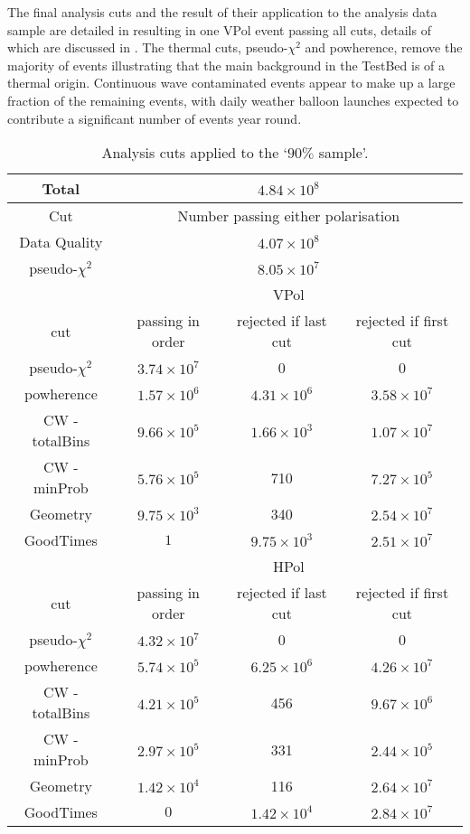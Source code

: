 The final analysis cuts and the result of their application to the analysis data sample are detailed in  resulting in one VPol event passing all cuts, details of which are discussed in . The thermal cuts, pseudo-$\chi^{2}$ and powherence, remove the majority of events illustrating that the main background in the TestBed is of a thermal origin. Continuous wave contaminated events appear to make up a large fraction of the remaining events, with daily weather balloon launches expected to contribute a significant number of events year round. 

\begin{table}
  \begin{center}
    \begin{tabular}{ c || c | c | c }
      Total & \multicolumn{3}{c}{ $4.84 \times 10^{8}$}\\
      \hline
      Cut & \multicolumn{3}{c}{ Number passing either polarisation}\\      
      \hline
      Data Quality & \multicolumn{3}{c}{$4.07 \times 10^8$}\\
      pseudo-$\chi^{2}$ & \multicolumn{3}{c}{$8.05 \times 10^7$}\\
      \hline\hline
      & \multicolumn{3}{c}{VPol}\\
      \hline
      cut & passing in order & rejected if last cut & rejected if first cut \\
      \hline
      pseudo-$\chi^{2}$ & $3.74 \times 10^7$ & 0 & 0\\
      powherence & $1.57 \times 10^6$ & $4.31 \times 10^6$ & $3.58 \times 10^7$\\
      CW - totalBins & $9.66 \times 10^5$ & $1.66 \times 10^3$ & $1.07 \times 10^7$\\
      CW - minProb & $5.76 \times 10^5$ & 710 & $7.27 \times 10^5$\\
      Geometry & $9.75 \times 10^3$ & 340 & $2.54 \times 10^7$\\
      GoodTimes & $1$ & $9.75 \times 10^3$ & $2.51 \times 10^7$\\
      \hline\hline
      & \multicolumn{3}{c}{HPol}\\
      \hline
      cut & passing in order & rejected if last cut & rejected if first cut \\
      \hline
      pseudo-$\chi^{2}$ & $4.32 \times 10^7$ & 0 & 0\\
      powherence & $5.74 \times 10^5$ & $6.25 \times 10^6$ & $4.26 \times 10^7$\\
      CW - totalBins & $4.21 \times 10^5$ & 456 & $9.67 \times 10^6$\\
      CW - minProb & $2.97 \times 10^5$ & 331 & $2.44 \times 10^5$\\
      Geometry & $1.42 \times 10^4$ & 116 & $2.64 \times 10^7$\\
      GoodTimes & $0$ & $1.42 \times 10^4$ & $2.84 \times 10^7$\\      
      \end{tabular} 
    \caption{Analysis cuts applied to the `$90 \%$ sample'.}
    \label{tab:Analysis:Cut-Flow}
  \end{center}
\end{table}

